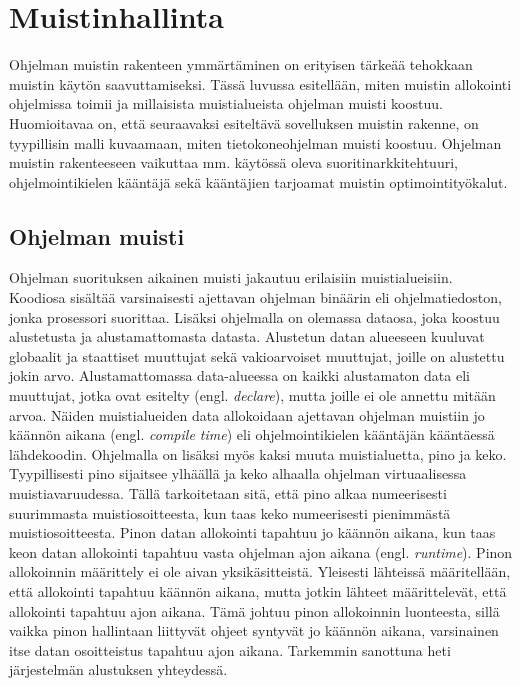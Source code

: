 \chapter{Muistinhallinta} \label{Toinen luku}

Ohjelman muistin rakenteen ymmärtäminen on erityisen tärkeää tehokkaan muistin käytön saavuttamiseksi. Tässä luvussa esitellään, miten muistin allokointi ohjelmissa toimii ja millaisista muistialueista ohjelman muisti koostuu. Huomioitavaa on, että seuraavaksi esiteltävä sovelluksen muistin rakenne, on tyypillisin malli kuvaamaan, miten tietokoneohjelman muisti koostuu. Ohjelman muistin rakenteeseen vaikuttaa mm. käytössä oleva suoritinarkkitehtuuri, ohjelmointikielen kääntäjä sekä kääntäjien tarjoamat muistin optimointityökalut.

\section{Ohjelman muisti}

Ohjelman suorituksen aikainen muisti jakautuu erilaisiin muistialueisiin. Koodiosa sisältää varsinaisesti ajettavan ohjelman binäärin eli ohjelmatiedoston, jonka prosessori suorittaa. Lisäksi ohjelmalla on olemassa dataosa, joka koostuu alustetusta ja alustamattomasta datasta. Alustetun datan alueeseen kuuluvat globaalit ja staattiset muuttujat sekä vakioarvoiset muuttujat, joille on alustettu jokin arvo. Alustamattomassa data-alueessa on kaikki alustamaton data eli muuttujat, jotka ovat esitelty (engl. \textit{declare}), mutta joille ei ole annettu mitään arvoa. Näiden muistialueiden data allokoidaan ajettavan ohjelman muistiin jo käännön aikana (engl. \textit{compile time}) eli ohjelmointikielen kääntäjän kääntäessä lähdekoodin. Ohjelmalla on lisäksi myös kaksi muuta muistialuetta, pino ja keko. Tyypillisesti pino sijaitsee ylhäällä ja keko alhaalla ohjelman virtuaalisessa muistiavaruudessa.\cite{mmic2010} Tällä tarkoitetaan sitä, että pino alkaa numeerisesti suurimmasta muistiosoitteesta, kun taas keko numeerisesti pienimmästä muistiosoitteesta. Pinon datan allokointi tapahtuu jo käännön aikana, kun taas keon datan allokointi tapahtuu vasta ohjelman ajon aikana (engl. \textit{runtime})\cite{ddm2015book}. Pinon allokoinnin määrittely ei ole aivan yksikäsitteistä. Yleisesti lähteissä määritellään, että allokointi tapahtuu käännön aikana, mutta jotkin lähteet määrittelevät, että allokointi tapahtuu ajon aikana. Tämä johtuu pinon allokoinnin luonteesta, sillä vaikka pinon hallintaan liittyvät ohjeet syntyvät jo käännön aikana, varsinainen itse datan osoitteistus tapahtuu ajon aikana. Tarkemmin sanottuna heti järjestelmän alustuksen yhteydessä.

